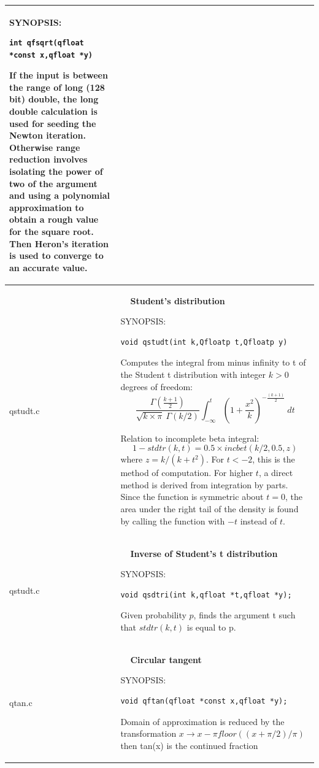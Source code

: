 \documentclass[10pt,a4paper,x11names]{memoir} %
\newcounter{entry}
\newcommand{\TOC}[1] {\addcontentsline{toc}{section}{\theentry\ \  #1} \textbf{\theentry\ \  #1} \par\stepcounter{entry}}
\begin{document}
\begin{longtable}{|p{1.5cm}|p{11.5cm}|}
	{\footnotesize SYNOPSIS:}\vspace{-0.2cm}\index{qfsqrt}
	\begin{lstlisting}[numbers=none]
		int qfsqrt(qfloat *const x,qfloat *y)
	\end{lstlisting}\vspace{-0.2cm}
	
	If the input is between the range of long (128 bit)  double, the long double calculation is used for seeding
	the Newton iteration. Otherwise  range reduction involves isolating the power of two of the
	argument and using a polynomial approximation to obtain
	a rough value for the square root.  Then Heron's iteration
	is used to converge to an accurate value.
	\\\hline
	qstudt.c& \TOC{Student's distribution}
	
	{\footnotesize SYNOPSIS:}\vspace{-0.2cm}\index{qstudt}
	\begin{lstlisting}[numbers=none]
		void qstudt(int k,Qfloatp t,Qfloatp y)
	\end{lstlisting}\vspace{-0.2cm}
	
	Computes the integral from minus infinity to t of the Student
	t distribution with integer $k > 0$ degrees of freedom:
	$$\frac{\Gamma (\frac{k+1}{2})}{\sqrt{k \times \pi}\ \Gamma (k/2)}\int_{-\infty}^{t}\left( 1+\frac{x^2}{k}
	\right)^{-\frac{(k+1)}{2}}\ dt$$
	
	Relation to incomplete beta integral:
	$$ 1-stdtr(k,t)=0.5 \times incbet(k/2,0.5,z)$$
	where
	$ z = k/(k + t^2)$.
	For $t < -2$, this is the method of computation.  For higher $t$,
	a direct method is derived from integration by parts.
	Since the function is symmetric about $t=0$, the area under the
	right tail of the density is found by calling the function
	with $-t$ instead of $t$.
	\\\hline
	qstudt.c& \TOC{Inverse of Student's t distribution}
	
	{\footnotesize SYNOPSIS:}\vspace{-0.2cm}\index{qsdtri}
	\begin{lstlisting}[numbers=none]
		void qsdtri(int k,qfloat *t,qfloat *y);
	\end{lstlisting}\vspace{-0.2cm}
	Given probability $p$, finds the argument t such that $stdtr(k,t)$ is equal to p.
	\\\hline
	qtan.c& \TOC{Circular tangent}
	
	{\footnotesize SYNOPSIS:}\vspace{-0.2cm}\index{qftan}
	\begin{lstlisting}[numbers=none]
		void qftan(qfloat *const x,qfloat *y);
	\end{lstlisting}\vspace{-0.2cm}
	Domain of approximation is reduced by the transformation
	$x \rightarrow x - \pi floor((x + \pi/2)/\pi)$
	then tan(x) is the continued fraction
	

\end{longtable}
\end{document}
